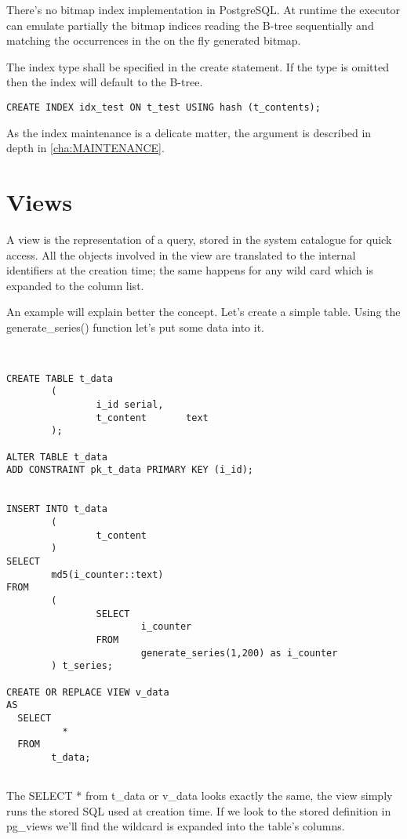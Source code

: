 There's no bitmap index implementation in PostgreSQL. 
At runtime the executor can emulate partially the bitmap indices reading the 
B-tree sequentially and matching the occurrences in the on the fly generated 
bitmap. 

The index type shall be specified in the create statement. If the type is 
omitted then the index will default to the B-tree.

\begin{lstlisting}[style=pgsql]
 CREATE INDEX idx_test ON t_test USING hash (t_contents);
\end{lstlisting}


As the index maintenance is a delicate matter, the argument is described in 
depth in \ref{cha:MAINTENANCE}.


\section{Views}
\label{sec:VIEWS}
A view is the representation of a query, stored in the system catalogue 
for quick access. All the objects involved in the view are translated to the 
internal identifiers at the creation time; the same happens for any wild card 
which is expanded to the column list.

An example will explain better the concept. Let's create a simple table. Using 
the generate\_series() function let's put some data into it.

\begin{lstlisting}[style=pgsql]


CREATE TABLE t_data 
        ( 
                i_id serial,
                t_content       text
        );

ALTER TABLE t_data 
ADD CONSTRAINT pk_t_data PRIMARY KEY (i_id);


INSERT INTO t_data
        (
                t_content
        )
SELECT
        md5(i_counter::text)
FROM
        (
                SELECT
                        i_counter
                FROM
                        generate_series(1,200) as i_counter
        ) t_series;

CREATE OR REPLACE VIEW v_data 
AS 
  SELECT 
          *
  FROM 
        t_data;


\end{lstlisting}

The SELECT * from t\_data or v\_data looks exactly the same, the view 
simply runs the stored SQL used at creation time.
If we look to the stored definition in pg\_views we'll find the wildcard is 
expanded into the table's columns.


